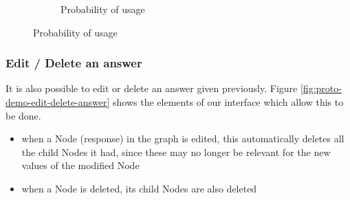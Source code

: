 \begin{figure}[h]
\begin{subfigure}[b]{0.45\textwidth}
            \caption{\label{fig:proto-demo-add-answer-proba} Probability of usage}
        \end{subfigure}
    \end{figure}
    
    
    \subsubsection{Edit / Delete an answer}
    It is also possible to edit or delete an answer given previously. Figure \ref{fig:proto-demo-edit-delete-answer} shows the elements of our interface which allow this to be done. 
    
    \begin{itemize}
        \item when a Node (response) in the graph is edited, this automatically deletes all the child Nodes it had, since these may no longer be relevant for the new values of the modified Node
        \item when a Node is deleted, its child Nodes are also deleted
    \end{itemize}

